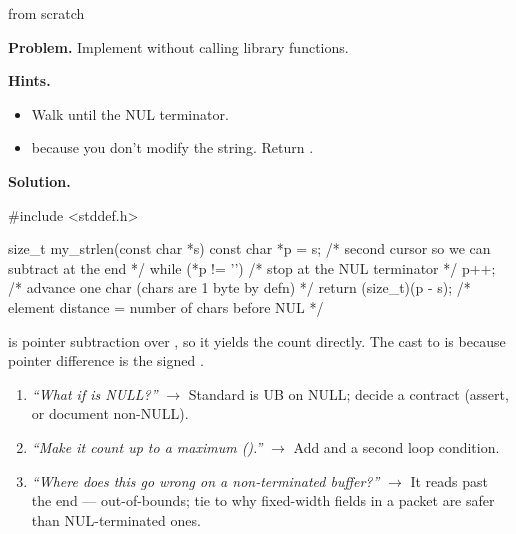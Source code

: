 \begin{gymproblem}{ from scratch}

\textbf{Problem.} Implement  without
calling library functions.

\textbf{Hints.}
\begin{itemize}
\item Walk until the NUL terminator.
\item {} because you don't modify the string. Return
  .
\end{itemize}

\attempt

\textbf{Solution.}
\begin{cgym}
#include <stddef.h>

size_t my_strlen(const char *s) {
    const char *p = s;        /* second cursor so we can subtract at the end    */
    while (*p != '\0') {      /* stop at the NUL terminator                     */
        p++;                  /* advance one char (chars are 1 byte by defn)    */
    }
    return (size_t)(p - s);   /* element distance = number of chars before NUL  */
}
\end{cgym}

 is pointer subtraction over , so it yields the count
directly. The cast to  is because pointer difference is the
signed .

\followups
\begin{enumerate}
\item \emph{``What if  is NULL?''} $\rightarrow$ Standard
   is UB on NULL; decide a contract (assert, or document
  non-NULL).
\item \emph{``Make it count up to a maximum ().''}
  $\rightarrow$ Add  and a second loop condition.
\item \emph{``Where does this go wrong on a non-terminated buffer?''}
  $\rightarrow$ It reads past the end --- out-of-bounds; tie to why
  fixed-width fields in a packet are safer than NUL-terminated ones.
\end{enumerate}
\end{gymproblem}

